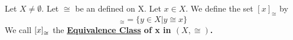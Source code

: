 \label{def:EquivalenceClass}
\newcommand{\EquivalenceClass}[0]{
    \bf \hyperref[def:EquivalenceClass]{Equivalence Class} \rm
}
\newcommand{\EqClass}[2]{
    \bra{#1}_{\cong}
}
\begin{df}
    
    Let $X \neq \emptyset$.
    Let $\cong$ be an 
	\EquivalenceRelation
	defined on X.  
    Let $x \in X$. 
    We define the set $[x]_{\cong}$ by 
    \begin{equation}
        [x]_{\cong} = \{y \in X | y \cong x\}
    \end{equation} 
    We call $\EqClass{x}{\cong}$ the \EquivalenceClass of x in $(X, \cong)$. 
\end{df}